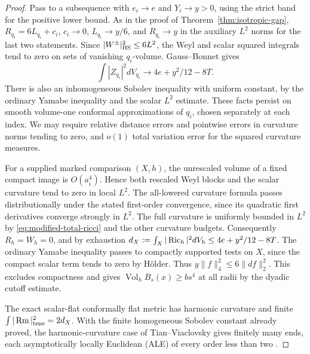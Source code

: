 \begin{proof}
Pass to a subsequence with \(e_i\to e\) and \(Y_i\to y>0\), using
the strict band for the positive lower bound. As in the proof of
Theorem~\ref{thm:isotropic-gap}, \(R_{q_i}=6L_{q_i}+c_i\),
\(c_i\to0\), \(L_{q_i}\to y/6\), and \(R_{q_i}\to y\) in
the auxiliary \(L^2\) norms for the last two statements. Since
\(|W^\pm|_{\rm HS}^2\le6L^2\), the Weyl and scalar squared
integrals tend to zero on sets of vanishing \(q_i\)-volume.
Gauss--Bonnet gives
\begin{equation}\label{eq:modified-total-ricci}
 \int |Z_{q_i}|^2dV_{q_i}\longrightarrow4e+y^2/12-8T.
\end{equation}
There is also an inhomogeneous Sobolev inequality with uniform
constant, by the ordinary Yamabe inequality and the scalar
\(L^2\) estimate. These facts persist on smooth volume-one
conformal approximations of \(q_i\), chosen separately at each
index. We may require relative distance errors and pointwise
errors in curvature norms tending to zero, and \(o(1)\) total
variation error for the squared curvature measures.

For a supplied marked comparison \((X,h)\), the unrescaled
volume of a fixed compact image is \(O(a_i^4)\). Hence both
rescaled Weyl blocks and the scalar curvature tend to zero
in local \(L^2\). The all-lowered curvature formula passes
distributionally under the stated first-order convergence,
since its quadratic first derivatives converge strongly in
\(L^2\). The full curvature is uniformly bounded in \(L^2\) by
\eqref{eq:modified-total-ricci} and the other curvature budgets.
Consequently \(R_h=W_h=0\), and by exhaustion
\(d_X:=\int_X|\operatorname{Ric}_h|^2dV_h\le4e+y^2/12-8T\).
The ordinary Yamabe inequality passes to compactly supported
tests on \(X\), since the compact scalar term tends to zero by
H\"older. Thus \(y\|f\|_4^2\le6\|df\|_2^2\). This excludes
compactness and gives \(\operatorname{Vol}_h B_s(x)\ge bs^4\)
at all radii by the dyadic cutoff estimate.

The exact scalar-flat conformally flat metric has harmonic
curvature and finite \(\int|\operatorname{Rm}|_{\rm tens}^2=2d_X\). With the finite homogeneous Sobolev constant already proved,
the harmonic-curvature case of Tian--Viaclovsky gives finitely many
ends, each asymptotically locally Euclidean (ALE) of every order
less than two \cite[Theorem~5.1]{TianViaclovsky2008Volume}.


\end{proof}
